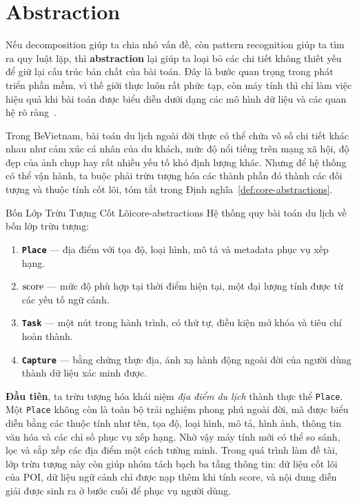 \section{Abstraction}

Nếu decomposition giúp ta chia nhỏ vấn đề, còn pattern recognition giúp
ta tìm ra quy luật lặp, thì \textbf{abstraction} lại giúp ta loại bỏ các
chi tiết không thiết yếu để giữ lại cấu trúc bản chất của bài toán. Đây
là bước quan trọng trong phát triển phần mềm, vì thế giới thực luôn
rất phức tạp, còn máy tính thì chỉ làm việc hiệu quả khi bài toán được
biểu diễn dưới dạng các mô hình dữ liệu và các quan hệ rõ ràng~\cite{wing2006, spronck2023, openstax_ct}.

Trong BeVietnam, bài toán du lịch ngoài đời thực có thể chứa vô số chi
tiết khác nhau như cảm xúc cá nhân của du khách, mức độ nổi tiếng trên
mạng xã hội, độ đẹp của ảnh chụp hay rất nhiều yếu tố khó định lượng
khác. Nhưng để hệ thống có thể vận hành, ta buộc phải trừu tượng hóa các
thành phần đó thành các đối tượng và thuộc tính cốt lõi, tóm tắt trong
Định nghĩa~\ref{def:core-abstractions}.

\begin{mydef}{Bốn Lớp Trừu Tượng Cốt Lõi}{core-abstractions}
Hệ thống quy bài toán du lịch về bốn lớp trừu tượng:
\begin{enumerate}[label=\textbf{\arabic*.}, leftmargin=2.2cm, noitemsep]
    \item \textbf{\texttt{Place}} --- địa điểm với tọa độ, loại hình, mô tả
          và metadata phục vụ xếp hạng.
    \item \textbf{$\operatorname{score}$} --- mức độ phù hợp tại thời điểm hiện tại, một
          đại lượng tính được từ các yếu tố ngữ cảnh.
    \item \textbf{\texttt{Task}} --- một nút trong hành trình, có thứ tự,
          điều kiện mở khóa và tiêu chí hoàn thành.
    \item \textbf{\texttt{Capture}} --- bằng chứng thực địa, ánh xạ hành
          động ngoài đời của người dùng thành dữ liệu xác minh được.
\end{enumerate}
\end{mydef}

\textbf{Đầu tiên}, ta trừu tượng hóa khái niệm \textit{địa điểm du lịch}
thành thực thể \texttt{Place}. Một \texttt{Place} không còn là toàn bộ
trải nghiệm phong phú ngoài đời, mà được biểu diễn bằng các thuộc tính
như tên, tọa độ, loại hình, mô tả, hình ảnh, thông tin văn hóa và các
chỉ số phục vụ xếp hạng. Nhờ vậy máy tính mới có thể so sánh, lọc và
sắp xếp các địa điểm một cách tường minh. Trong quá trình làm đề tài,
lớp trừu tượng này còn giúp nhóm tách bạch ba tầng thông tin: dữ liệu
cốt lõi của POI, dữ liệu ngữ cảnh chỉ được nạp thêm khi tính score, và
nội dung diễn giải được sinh ra ở bước cuối để phục vụ người dùng.

